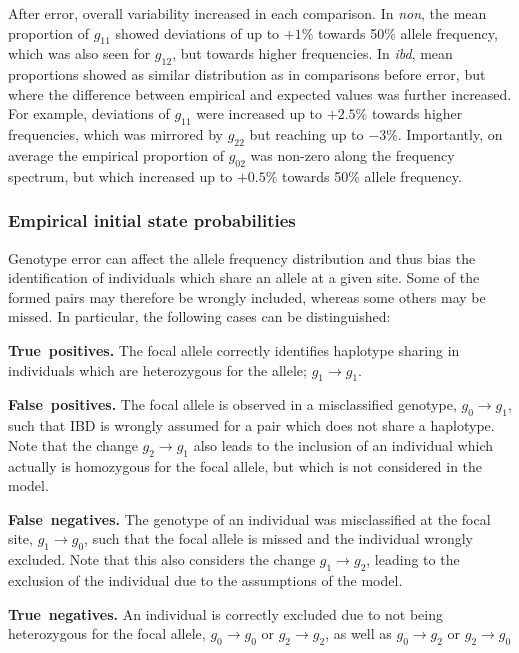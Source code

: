 After error, overall variability increased in each comparison.
In \emph{non}, the mean proportion of $g_{11}$ showed deviations of up to $+1\%$ towards 50\% allele frequency, which was also seen for $g_{12}$, but towards higher frequencies.
In \emph{ibd}, mean proportions showed as similar distribution as in comparisons before error, but where the difference between empirical and expected values was further increased.
For example, deviations of $g_{11}$ were increased up to $+2.5\%$ towards higher frequencies, which was mirrored by $g_{22}$ but reaching up to $-3\%$.
Importantly, on average the empirical proportion of $g_{02}$ was non-zero along the frequency spectrum, but which increased up to $+0.5\%$ towards 50\% allele frequency.


%
\subsubsection{Empirical initial state probabilities}
%

Genotype error can affect the allele frequency distribution and thus bias the identification of individuals which share an allele at a given site.
Some of the formed pairs may therefore be wrongly included, whereas some others may be missed.
In particular, the following  cases can be distinguished:
\begin{case}
	\item\label{case:true_pos} \textbf{True~positives.} The focal allele correctly identifies haplotype sharing in  individuals which are heterozygous for the allele; \ie ${g_{1} \rightarrow g_{1}}$.
	\item\label{case:false_pos} \textbf{False~positives.} The focal allele is observed in a misclassified genotype, ${g_{0} \rightarrow g_{1}}$, such that IBD is wrongly assumed for a pair which does not share a haplotype.
	Note that the change ${g_{2} \rightarrow g_{1}}$ also leads to the inclusion of an individual which actually is homozygous for the focal allele, but which is not considered in the model.
	\item\label{case:false_neg} \textbf{False~negatives.} The genotype of an individual was misclassified at the focal site, ${g_{1} \rightarrow g_{0}}$, such that the focal allele is missed and the individual wrongly excluded.
	Note that this also considers the change ${g_{1} \rightarrow g_{2}}$, leading to the exclusion of the individual due to the assumptions of the model.
	\item\label{case:true_neg} \textbf{True~negatives.} An individual is correctly excluded due to not being heterozygous for the focal allele, \ie ${g_{0} \rightarrow g_{0}}$ or ${g_{2} \rightarrow g_{2}}$, as well as ${g_{0} \rightarrow g_{2}}$ or ${g_{2} \rightarrow g_{0}}$
\end{case}

